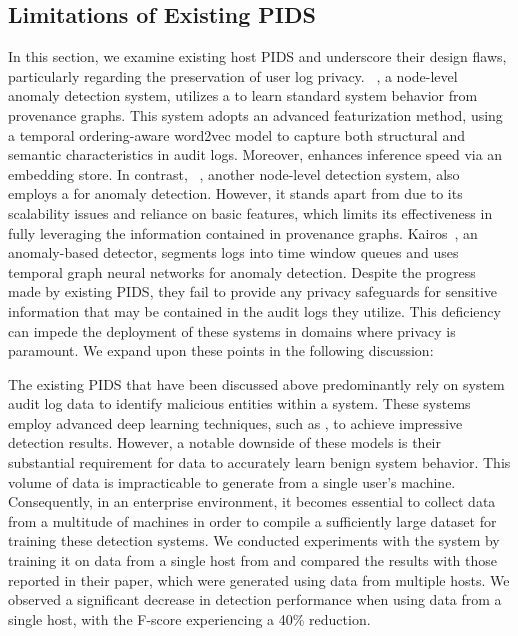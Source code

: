 \subsection{Limitations of Existing PIDS}
In this section, we examine existing host PIDS and underscore their design flaws, particularly regarding the preservation of user log privacy. \flash~\cite{flash2024}, a node-level anomaly detection system, utilizes a \gnn to learn standard system behavior from provenance graphs. This system adopts an advanced featurization method, using a temporal ordering-aware word2vec model to capture both structural and semantic characteristics in audit logs. Moreover, \flash enhances inference speed via an \gnnshort embedding store. In contrast, \threatrace~\cite{wang2022threatrace}, another node-level detection system, also employs a \gnn for anomaly detection. However, it stands apart from \flash due to its scalability issues and reliance on basic features, which limits its effectiveness in fully leveraging the information contained in provenance graphs. Kairos~\cite{cheng2023kairos}, an anomaly-based detector, segments logs into time window queues and uses temporal graph neural networks for anomaly detection. Despite the progress made by existing PIDS, they fail to provide any privacy safeguards for sensitive information that may be contained in the audit logs they utilize. This deficiency can impede the deployment of these systems in domains where privacy is paramount. We expand upon these points in the following discussion: 

 The existing PIDS that have been discussed above predominantly rely on system audit log data to identify malicious entities within a system. These systems employ advanced deep learning techniques, such as \gnn, to achieve impressive detection results. However, a notable downside of these models is their substantial requirement for data to accurately learn benign system behavior. This volume of data is impracticable to generate from a single user's machine. Consequently, in an enterprise environment, it becomes essential to collect data from a multitude of machines in order to compile a sufficiently large dataset for training these detection systems.  We conducted experiments with the \flash system by training it on data from a single host from \optc and compared the results with those reported in their paper, which were generated using data from multiple hosts. We observed a significant decrease in detection performance when using data from a single host, with the F-score experiencing a 40\% reduction.


